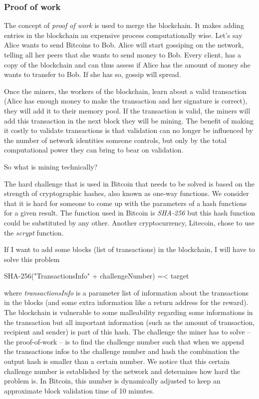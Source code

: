 \documentclass{vldb}
\begin{document}
\subsubsection{Proof of work}

The concept of \emph{proof of work} is used to merge the blockchain. It makes adding entries in the blockchain an expensive process computationally wise. Let's say Alice wants to send Bitcoins to Bob. Alice will start gossiping on the network, telling all her peers that she wants to send money to Bob. Every client, has a copy of the blockchain and can thus assess if Alice has the amount of money she wants to transfer to Bob. If she has so, gossip will spread.

Once the miners, the workers of the blockchain, learn about a  valid transaction (Alice has enough money to make the transaction and her signature is correct), they will add it to their memory pool. If the transaction is valid, the miners will add this transaction in the next block they will be mining. The benefit of making it costly to validate transactions is that validation can no longer be influenced by the number of network identities someone controls, but only by the total computational power they can bring to bear on validation.

So what is mining technically?

The hard challenge that is used in Bitcoin that needs to be solved is based on the strength of cryptographic hashes, also known as one-way functions. We consider that it is hard for someone to come up with the parameters of a hash functions for a given result. The function used in Bitcoin is \emph{SHA-256} but this hash function could be substituted by any other. Another cryptocurrency, Litecoin, chose to use the \emph{scrypt} function.

If I want to add some blocks (list of transactions) in the blockchain, I will have to solve this problem

SHA-256("TransactionsInfo" + challengeNumber) =< target

where \emph{transactionsInfo} is a parameter list of information about the transactions in the blocks (and some extra information like a return address for the reward). The blockchain is vulnerable to some malleability regarding some informations in the transaction but all important information (such as the amount of transaction, recipient and sender) is part of this hash.
The challenge the miner has to solve – the proof-of-work – is to find the challenge number such that when we append the transactions infos to the challenge number and hash the combination the output hash is smaller than a certain number.
We notice that this certain challenge number is established by the network and determines how hard the problem is. In Bitcoin, this number is dynamically adjusted to keep an approximate block validation time of 10 minutes.\cite{hashCash}
\end{document}
